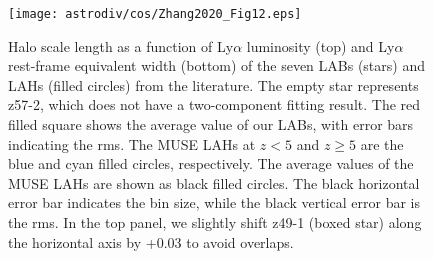 \begin{figure}
\begin{center}
\texttt{[image: astrodiv/cos/Zhang2020\_Fig12.eps]} 
\end{center}
\vspace{-5mm}
\caption{
Halo scale length as a function of Ly$\alpha$ luminosity (top) and Ly$\alpha$ rest-frame equivalent width (bottom) 
of the seven LABs (stars) and LAHs (filled circles) from the literature. 
The empty star represents z57-2, which does not have a two-component fitting result. 
The red filled square shows the average value of our LABs, 
with error bars indicating the rms.  
The MUSE LAHs at $z<5$ and $z\geq5$ are the blue and cyan filled circles, respectively. 
The average values of the MUSE LAHs are shown as black filled circles. 
The black horizontal error bar indicates the bin size, 
while the black vertical error bar is the rms. 
In the top panel, we slightly shift z49-1 (boxed star) along the horizontal axis by +0.03 to avoid overlaps.
}
\label{cos:Zhang2020_Fig12}
\end{figure}



